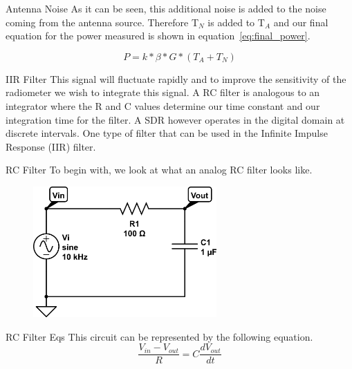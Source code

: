 \documentclass{beamer}
\begin{document}
\begin{frame}
\begin{block}{Antenna Noise}
As it can be seen, this additional noise is added to the noise coming from the antenna source.  Therefore T$_{N}$ is added to T$_{A}$ and our final equation for the power measured is shown in equation~\ref{eq:final_power}.  

\begin{equation} \label{eq:final_power}
P=k*\beta*G*(T_{A}+T_{N})
\end{equation}
\end{block}
\end{frame}

\begin{frame}
\begin{block}{IIR Filter}
This signal will fluctuate rapidly and to improve the sensitivity of the radiometer we wish to integrate this signal.  A RC filter is analogous to an integrator where the R and C values determine our time constant and our integration time for the filter.  A SDR however operates in the digital domain at discrete intervals.  One type of filter that can be used in the Infinite Impulse Response (IIR) filter. 
\end{block}
\end{frame}

\begin{frame}
\begin{block}{RC Filter}
To begin with, we look at what an analog RC filter looks like. 

{\begin{figure}[h!tb] 
\centering
\includegraphics[width=7cm]{../Images/rc-circuit.png}
\label{rc_circuit}
\end{figure}
}
\end{block}
\end{frame}

\begin{frame}
\begin{block}{RC Filter Eqs}
This circuit can be represented by the following equation.
\begin{equation}\label{eq:rc_circuit_eq}
\frac{V_{in}-V_{out}}{R}=C\frac{dV_{out}}{dt}
\end{equation}
\end{block}
\end{frame}
\end{document}
